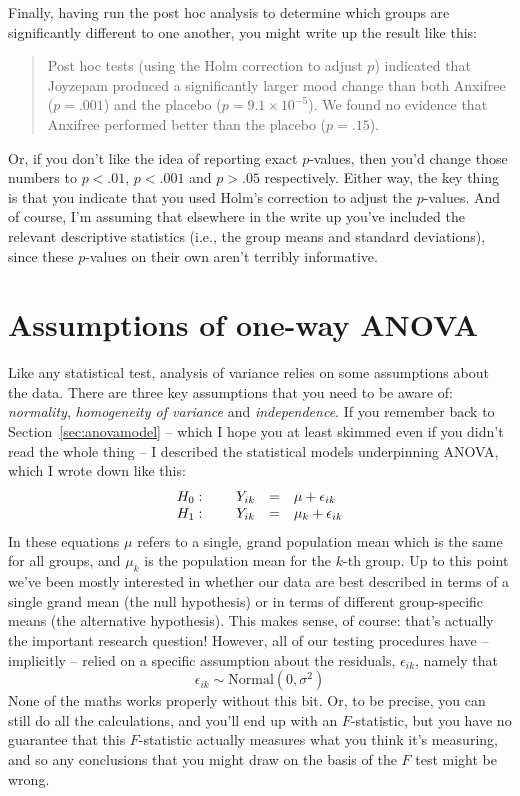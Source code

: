 
Finally, having run the post hoc analysis to determine which groups are significantly different to one another, you might write up the result like this:
\begin{quote}
Post hoc tests (using the Holm correction to adjust $p$) indicated that Joyzepam produced a significantly larger mood change than both Anxifree ($p = .001$) and the placebo ($p = 9.1 \times 10^{-5}$). We found no evidence that Anxifree performed better than the placebo ($p = .15$).
\end{quote}
Or, if you don't like the idea of reporting exact $p$-values, then you'd change those numbers to $p<.01$, $p<.001$ and $p > .05$ respectively. Either way, the key thing is that you indicate that you used Holm's correction to adjust the $p$-values. And of course, I'm assuming that elsewhere in the write up you've included the relevant descriptive statistics (i.e., the group means and standard deviations), since these $p$-values on their own aren't terribly informative. 


\section{Assumptions of one-way ANOVA \label{sec:anovaassumptions}}

Like any statistical test, analysis of variance relies on some assumptions about the data. There are three key assumptions that you need to be aware of: {\it normality}, {\it homogeneity of variance} and {\it independence}. If you remember back to Section~\ref{sec:anovamodel} -- which I hope you at least skimmed even if you didn't read the whole thing -- I described the statistical models underpinning ANOVA, which I wrote down like this:
$$
\begin{array}{lrcl}
H_0: \hspace*{.5cm} & Y_{ik} &=& \mu + \epsilon_{ik} \\
H_1: & Y_{ik} &=& \mu_k + \epsilon_{ik} 
\end{array}
$$
In these equations $\mu$ refers to a single, grand population mean which is the same for all groups, and $\mu_k$ is the population mean for the $k$-th group. Up to this point we've been mostly interested in whether our data are best described in terms of a single grand mean (the null hypothesis) or in terms of different group-specific means (the alternative hypothesis). This makes sense, of course: that's actually the important research question! However, all of our testing procedures have -- implicitly -- relied on a specific assumption about the residuals, $\epsilon_{ik}$, namely that
$$
\epsilon_{ik} \sim \mbox{Normal}(0, \sigma^2)
$$
None of the maths works properly without this bit. Or, to be precise, you can still do all the calculations, and you'll end up with an $F$-statistic, but you have no guarantee that this $F$-statistic actually measures what you think it's measuring, and so any conclusions that you might draw on the basis of the $F$ test might be wrong. 

